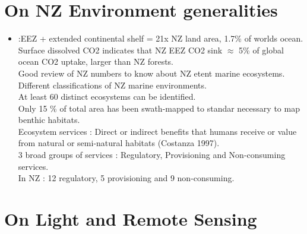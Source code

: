 \documentclass[]{report}
\begin{document}
	\section{On NZ Environment generalities}
	\begin{itemize}
		\item \cite{macdiarmid2013new} :EEZ + extended continental shelf = 21x NZ land area, 1.7\% of worlds ocean.
		\\Surface dissolved CO2 indicates that NZ EEZ CO2 sink $\approx$ 5\% of global ocean CO2 uptake, larger than NZ forests.
		\\Good review of NZ numbers to know about NZ etent marine ecosystems.
		\\Different classifications of NZ marine environments.
		\\At least 60 distinct ecosystems can be identified.
		\\ Only 15 \% of total area has been swath-mapped to standar necessary to map benthic habitats.
		\\ Ecosystem services : Direct or indirect benefits that humans receive or value from natural or semi-natural habitats (Costanza 1997).
		\\3 broad groups of services : Regulatory, Provisioning and Non-consuming services.
		\\ In NZ : 12 regulatory, 5 provisioning and 9 non-consuming.  
		
	\end{itemize}
	
	\section{On Light and Remote Sensing}
	
\end{document}
